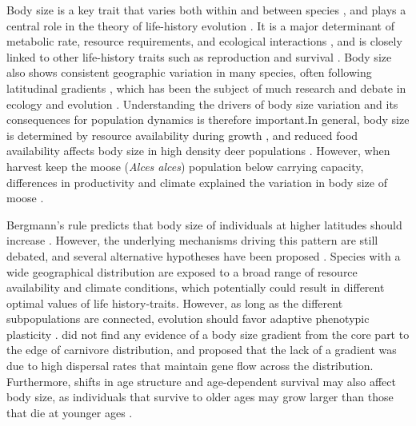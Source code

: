 \documentclass[12pt,a4paper,final,abstract=true,headings=small]{scrartcl}
\begin{document}
Body size is a key trait that varies both within and between species \citep{blanckenhornEvolutionBodySize2000}, and plays a central role in the theory of life-history evolution \citep{stearnsLifeHistoryEvolution2000,clausetEvolutionDistributionSpecies2008}. It is a major determinant of metabolic rate, resource requirements, and ecological interactions \citep{brownMetabolicTheoryEcology2004}, and is closely linked to other life-history traits such as reproduction and survival \citep{roffPredictingBodySize1986,siblyEffectsBodySize2007,brooksHowWellCan2016}. Body size also shows consistent geographic variation in many species, often following latitudinal gradients \citep{blanckenhornEvolutionBodySize2000,hustonRegulationAnimalSize2011}, which has been the subject of much research and debate in ecology and evolution \citep{mcnabEcologicalSignificanceBergmanns1971,blackburnGeographicGradientsBody1999}. Understanding the drivers of body size variation and its consequences for population dynamics is therefore important.In general, body size is determined by resource availability during growth \citep{geistBergmannsRuleInvalid1987}, and reduced food availability affects body size in high density deer populations \citep{albonEarlyDevelopmentPopulation1987,festa-bianchetEarlyDevelopmentAdult2000,gaillardCohortEffectsDeer2003}. However, when harvest keep the moose (\emph{Alces alces}) population below carrying capacity, differences in productivity and climate explained the variation in body size of moose \citep{hjeljordRangebodyMassInteractions1999}.

Bergmann's rule predicts that body size of individuals at higher latitudes should increase  \citep{blanckenhornEvolutionBodySize2000}. However, the underlying mechanisms driving this pattern are still debated, and several alternative hypotheses have been proposed \citep{mcnabEcologicalSignificanceBergmanns1971,blackburnGeographicGradientsBody1999,}. Species with a wide geographical distribution are exposed to a broad range of resource availability  and climate conditions, which potentially could result in different optimal values of life history-traits. However, as long as the different subpopulations are connected, evolution should favor adaptive phenotypic plasticity \citep{mcnamaraStatedependentLifeHistories1996,kaweckiEvolutionLifeHistories1993}. \citet{meiriLifeEdgeCarnivore2009a} did not find any evidence of a body size gradient from the core part to the edge of carnivore distribution, and proposed that the lack of a gradient was due to high dispersal rates that maintain gene flow across the distribution. Furthermore, shifts in age structure and age-dependent survival may also affect body size, as individuals that survive to older ages may grow larger than those that die at younger ages \citep{theriotAccountingAgeUncovering2024a}.
\end{document}
